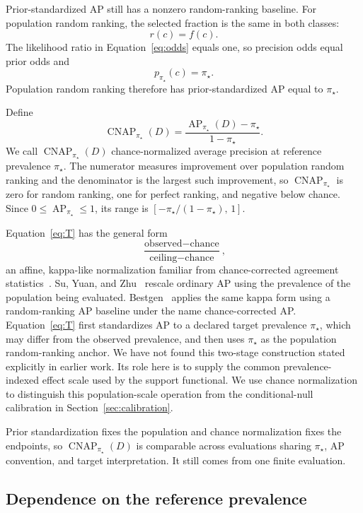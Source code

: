 \documentclass[11pt]{article}
\newcommand{\AP}{\operatorname{AP}}
\newcommand{\CNAP}{\operatorname{CNAP}}
\newcommand{\Tpi}{\CNAP_{\pi_\star}}
\theoremstyle{remark}
\begin{document}
Prior-standardized AP still has a nonzero random-ranking baseline. For population random ranking, the selected fraction is the same in both classes:
\[
r(c)=f(c).
\]
The likelihood ratio in Equation~\eqref{eq:odds} equals one, so precision odds equal prior odds and
\[
p_{\pi_\star}(c)=\pi_\star.
\]
Population random ranking therefore has prior-standardized AP equal to $\pi_\star$.

Define
\begin{equation}
\Tpi(D)
=
\frac{\AP_{\pi_\star}(D)-\pi_\star}{1-\pi_\star}.
\label{eq:T}
\end{equation}
We call $\Tpi(D)$ chance-normalized average precision at reference prevalence $\pi_\star$. The numerator measures improvement over population random ranking and the denominator is the largest such improvement, so $\Tpi$ is zero for random ranking, one for perfect ranking, and negative below chance. Since $0\leq \AP_{\pi_\star}\leq 1$, its range is $[-\pi_\star/(1-\pi_\star),\,1]$.

Equation~\eqref{eq:T} has the general form
\begin{equation}
\frac{\text{observed}-\text{chance}}{\text{ceiling}-\text{chance}},
\label{eq:kappa-form}
\end{equation}
an affine, kappa-like normalization familiar from chance-corrected agreement statistics~\cite{cohen1960coefficient}. Su, Yuan, and Zhu~\cite{suyuan2015relationship} rescale ordinary AP using the prevalence of the population being evaluated. Bestgen~\cite{bestgen2021fisher} applies the same kappa form using a random-ranking AP baseline under the name chance-corrected AP. Equation~\eqref{eq:T} first standardizes AP to a declared target prevalence $\pi_\star$, which may differ from the observed prevalence, and then uses $\pi_\star$ as the population random-ranking anchor. We have not found this two-stage construction stated explicitly in earlier work. Its role here is to supply the common prevalence-indexed effect scale used by the support functional. We use chance normalization to distinguish this population-scale operation from the conditional-null calibration in Section~\ref{sec:calibration}.

Prior standardization fixes the population and chance normalization fixes the endpoints, so $\Tpi(D)$ is comparable across evaluations sharing $\pi_\star$, AP convention, and target interpretation. It still comes from one finite evaluation.

\subsection{Dependence on the reference prevalence}
\end{document}
